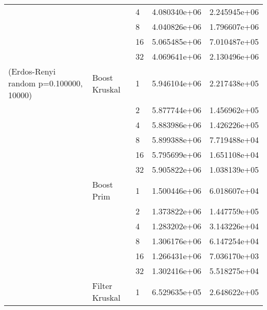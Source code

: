 \begin{tabular}{lllrr}
                                                       &                     & 4  &  4.080340e+06 &  2.245945e+06 \\
                                                       &                     & 8  &  4.040826e+06 &  1.796607e+06 \\
                                                       &                     & 16 &  5.065485e+06 &  7.010487e+05 \\
                                                       &                     & 32 &  4.069641e+06 &  2.130496e+06 \\
(Erdos-Renyi random p=0.100000, 10000) & Boost Kruskal & 1  &  5.946104e+06 &  2.217438e+05 \\
                                                       &                     & 2  &  5.877744e+06 &  1.456962e+05 \\
                                                       &                     & 4  &  5.883986e+06 &  1.426226e+05 \\
                                                       &                     & 8  &  5.899388e+06 &  7.719488e+04 \\
                                                       &                     & 16 &  5.795699e+06 &  1.651108e+04 \\
                                                       &                     & 32 &  5.905822e+06 &  1.038139e+05 \\
                                                       & Boost Prim & 1  &  1.500446e+06 &  6.018607e+04 \\
                                                       &                     & 2  &  1.373822e+06 &  1.447759e+05 \\
                                                       &                     & 4  &  1.283202e+06 &  3.143226e+04 \\
                                                       &                     & 8  &  1.306176e+06 &  6.147254e+04 \\
                                                       &                     & 16 &  1.266431e+06 &  7.036170e+03 \\
                                                       &                     & 32 &  1.302416e+06 &  5.518275e+04 \\
                                                       & Filter Kruskal & 1  &  6.529635e+05 &  2.648622e+05 \\

\end{tabular}
